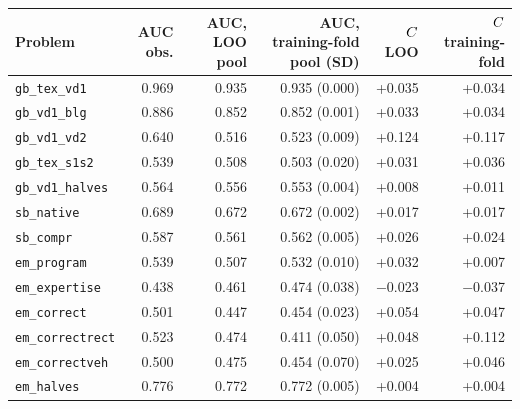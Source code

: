 \begin{tabular}{lrrrrr}
\toprule
Problem & AUC obs. & AUC, LOO pool & AUC, training-fold pool (SD) & $C$ LOO & $C$ training-fold \\
\midrule
\texttt{gb\_tex\_vd1} & 0.969 & 0.935 & 0.935 (0.000) & +0.035 & +0.034 \\
\texttt{gb\_vd1\_blg} & 0.886 & 0.852 & 0.852 (0.001) & +0.033 & +0.034 \\
\texttt{gb\_vd1\_vd2} & 0.640 & 0.516 & 0.523 (0.009) & +0.124 & +0.117 \\
\texttt{gb\_tex\_s1s2} & 0.539 & 0.508 & 0.503 (0.020) & +0.031 & +0.036 \\
\texttt{gb\_vd1\_halves} & 0.564 & 0.556 & 0.553 (0.004) & +0.008 & +0.011 \\
\texttt{sb\_native} & 0.689 & 0.672 & 0.672 (0.002) & +0.017 & +0.017 \\
\texttt{sb\_compr} & 0.587 & 0.561 & 0.562 (0.005) & +0.026 & +0.024 \\
\texttt{em\_program} & 0.539 & 0.507 & 0.532 (0.010) & +0.032 & +0.007 \\
\texttt{em\_expertise} & 0.438 & 0.461 & 0.474 (0.038) & $-$0.023 & $-$0.037 \\
\texttt{em\_correct} & 0.501 & 0.447 & 0.454 (0.023) & +0.054 & +0.047 \\
\texttt{em\_correctrect} & 0.523 & 0.474 & 0.411 (0.050) & +0.048 & +0.112 \\
\texttt{em\_correctveh} & 0.500 & 0.475 & 0.454 (0.070) & +0.025 & +0.046 \\
\texttt{em\_halves} & 0.776 & 0.772 & 0.772 (0.005) & +0.004 & +0.004 \\
\bottomrule
\end{tabular}
